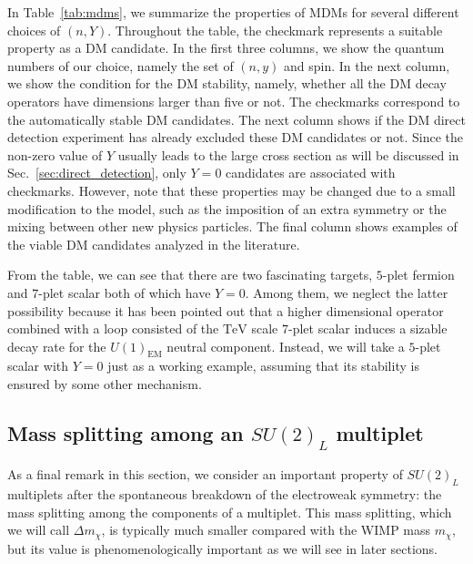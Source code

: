 \documentclass[12pt,twoside,book]{article}
\begin{document}
In Table~\ref{tab:mdms}, we summarize the properties of MDMs for several different choices of $(n, Y)$.
Throughout the table, the checkmark represents a suitable property as a DM candidate.
In the first three columns, we show the quantum numbers of our choice, namely the set of $(n,y)$ and spin.
In the next column, we show the condition for the DM stability, namely, whether all the DM decay operators have dimensions larger than five or not.
The checkmarks correspond to the automatically stable DM candidates.
The next column shows if the DM direct detection experiment has already excluded these DM candidates or not.
Since the non-zero value of $Y$ usually leads to the large cross section as will be discussed in Sec.~\ref{sec:direct_detection}, only $Y=0$ candidates are associated with checkmarks.
However, note that these properties may be changed due to a small modification to the model, such as the imposition of an extra symmetry or the mixing between other new physics particles.
The final column shows examples of the viable DM candidates analyzed in the literature.

From the table, we can see that there are two fascinating targets, $5$-plet fermion and $7$-plet scalar both of which have $Y=0$.
Among them, we neglect the latter possibility because it has been pointed out \cite{DiLuzio:2015oha, DelNobile:2015bqo} that a higher dimensional operator combined with a loop consisted of the $\mathrm{TeV}$ scale $7$-plet scalar induces a sizable decay rate for the $U(1)_{\mathrm{EM}}$ neutral component.
Instead, we will take a $5$-plet scalar with $Y=0$ just as a working example, assuming that its stability is ensured by some other mechanism.


\subsection{Mass splitting among an $SU(2)_L$ multiplet}
\label{sec:mass_splitting}

As a final remark in this section, we consider an important property of $SU(2)_L$ multiplets after the spontaneous breakdown of the electroweak symmetry: the mass splitting among the components of a multiplet.
This mass splitting, which we will call $\Delta m_\chi$, is typically much smaller compared with the WIMP mass $m_\chi$, but its value is phenomenologically important as we will see in later sections.
\end{document}
